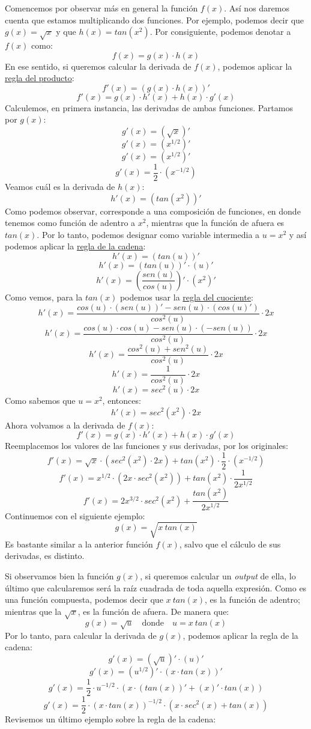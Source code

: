 \documentclass[12pt]{article}
\begin{document}
Comencemos por observar más en general la función $f(x)$. Así nos daremos cuenta que estamos multiplicando dos funciones. Por ejemplo, podemos decir que $g(x) = \sqrt{x}$ y que $h(x) = tan(x^{2})$. Por consiguiente, podemos denotar a $f(x)$ como:
\[f(x) = g(x) \cdot h(x)\]
En ese sentido, si queremos calcular la derivada de $f(x)$, podemos aplicar la \underline{regla del producto}:
\[f'(x) = (g(x) \cdot h(x))'\]
\[f'(x) = g(x) \cdot h'(x) + h(x) \cdot g'(x)\]
Calculemos, en primera instancia, las derivadas de ambas funciones. Partamos por $g(x)$:
\[g'(x) = (\sqrt{x})'\]
\[g'(x) = (x^{1/2})'\]
\[g'(x) = (x^{1/2})'\]
\[g'(x) = \frac{1}{2} \cdot (x^{-1/2})\]
Veamos cuál es la derivada de $h(x)$:
\[h'(x) = (tan(x^{2}))'\]
Como podemos observar, corresponde a una composición de funciones, en donde tenemos como función de adentro a $x^{2}$, mientras que la función de afuera es $tan(x)$. Por lo tanto, podemos designar como variable intermedia a $u = x^{2}$ y así podemos aplicar la \underline{regla de la cadena}:
\[h'(x) = (tan(u))'\]
\[h'(x) = (tan(u))' \cdot (u)'\]
\[h'(x) = \left(\frac{sen(u)}{cos(u)}\right)' \cdot (x^{2})'\]
Como vemos, para la $tan(x)$ podemos usar la \underline{regla del cuociente}:
\[h'(x) = \frac{cos(u) \cdot (sen(u))' - sen(u) \cdot (cos(u)')}{cos^{2}(u)} \cdot 2x\]
\[h'(x) = \frac{cos(u) \cdot cos(u) - sen(u) \cdot (-sen(u))}{cos^{2}(u)} \cdot 2x\]
\[h'(x) = \frac{cos^{2}(u) + sen^{2}(u)}{cos^{2}(u)} \cdot 2x\]
\[h'(x) = \frac{1}{cos^{2}(u)} \cdot 2x\]
\[h'(x) = sec^{2}(u) \cdot 2x\]
Como sabemos que $u = x^{2}$, entonces:
\[h'(x) = sec^{2}(x^{2}) \cdot 2x\]
Ahora volvamos a la derivada de $f(x)$:
\[f'(x) = g(x) \cdot h'(x) + h(x) \cdot g'(x)\]
Reemplacemos los valores de las funciones y sus derivadas, por los originales:
\[f'(x) = \sqrt{x} \cdot (sec^{2}(x^{2}) \cdot 2x) + tan(x^{2}) \cdot \frac{1}{2} \cdot (x^{-1/2})\]
\[f'(x) = x^{1/2} \cdot (2x \cdot sec^{2}(x^{2})) + tan(x^{2}) \cdot \frac{1}{2x^{1/2}}\]
\[f'(x) = 2x^{3/2} \cdot sec^{2}(x^{2}) + \frac{tan(x^{2})}{2x^{1/2}}\]
Continuemos con el siguiente ejemplo:
\[g(x) = \sqrt{x \ tan(x)}\]
Es bastante similar a la anterior función $f(x)$, salvo que el cálculo de sus derivadas, es distinto.

Si observamos bien la función $g(x)$, si queremos calcular un \textit{output} de ella, lo último que calcularemos será la raíz cuadrada de toda aquella expresión. Como es una función compuesta, podemos decir que $x \ tan(x)$, es la función de adentro; mientras que la $\sqrt{x}$, es la función de afuera. De manera que:
\[g(x) = \sqrt{u} \quad \mathrm{donde} \quad u = x \ tan(x)\]
Por lo tanto, para calcular la derivada de $g(x)$, podemos aplicar la regla de la cadena:
\[g'(x) = (\sqrt{u})' \cdot (u)'\]
\[g'(x) = (u^{1/2})' \cdot (x \cdot tan(x))'\]
\[g'(x) = \frac{1}{2} \cdot u^{-1/2} \cdot (x \cdot (tan(x))' + (x)' \cdot tan(x))\]
\[g'(x) = \frac{1}{2} \cdot (x \cdot tan(x))^{-1/2} \cdot (x \cdot sec^{2}(x) + tan(x))\]
Revisemos un último ejemplo sobre la regla de la cadena: 
\end{document}
